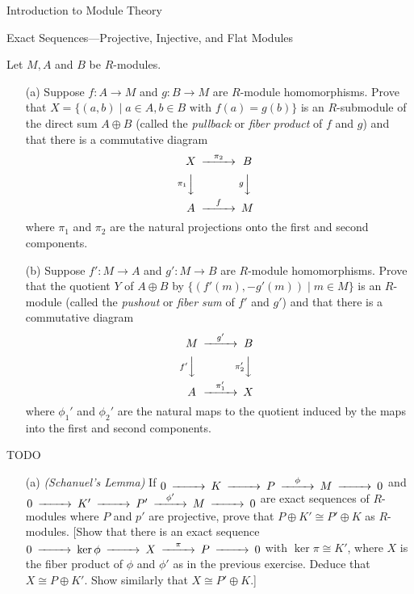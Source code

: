 \begin{chapter}{Introduction to Module Theory}
\begin{section}{Exact Sequences---Projective, Injective, and Flat Modules}
\begin{problem}\label{ex:10.5.27}
Let $M,A$ and $B$ be $R$-modules.\begin{enumerate}
\item[(a)] Suppose $f:A\to M$ and $g:B\to M$ are $R$-module homomorphisms. Prove that $X=\{(a,b)\mid a\in A,b\in B\text{ with } f(a) = g(b)\}$ is an $R$-submodule of the direct sum $A\oplus B$ (called the \emph{pullback} or \emph{fiber product} of $f$ and $g$) and that there is a commutative diagram \[
\begin{CD}
X@>\pi_2>>B\\
@V\pi_1VV @VgVV\\
A@>f>>M
\end{CD}
\]
where $\pi_1$ and $\pi_2$ are the natural projections onto the first and second components.

\item[(b)] Suppose $f':M\to A$ and $g':M\to B$ are $R$-module homomorphisms. Prove that the quotient $Y$ of $A\oplus B$ by $ \{(f'(m), -g'(m))\mid m\in M\}$ is an $R$-module (called the \emph{pushout} or \emph{fiber sum} of $f'$ and $g'$) and that there is a commutative diagram \[
\begin{CD}
M@>g'>>B\\
@Vf'VV @V\pi_2'VV\\
A@>\pi_1'>>X
\end{CD}
\]
where $\phi_1'$ and $\phi_2'$ are the natural maps to the quotient induced by the maps into the first and second components.
\end{enumerate}
\end{problem}
\begin{solution}TODO

\end{solution}\oneperpage



\begin{problem}\label{ex:10.5.28}
\begin{enumerate}
\item[(a)]\emph{(Schanuel's Lemma)} If $\begin{CD}0@>>>K@>>>P@>\phi>>M@>>>0\end{CD}$ and $\begin{CD}0@>>>K'@>>>P'@>\phi'>>M@>>>0\end{CD}$ are exact sequences of $R$-modules where $P$ and $p'$ are projective, prove that $P\oplus K'\cong P'\oplus K$ as $R$-modules. [Show that there is an exact sequence $\begin{CD}0@>>>\ker \phi @>>>X@>\pi>>P@>>>0\end{CD}$ with $\ker\pi \cong K'$, where $X$ is the fiber product of $\phi$ and $\phi'$ as in the previous exercise. Deduce that $X\cong P\oplus K'$. Show similarly that $X\cong P'\oplus K$.]


\end{enumerate}
\end{problem}
\end{section}
\end{chapter}
